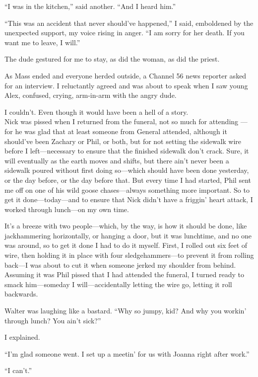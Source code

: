 ``I was in the kitchen,'' said another. ``And I heard him.''

``This was an accident that never should've happened,'' I said,
emboldened by the unexpected support, my voice rising in anger. ``I am
sorry for her death. If you want me to leave, I will.''

The dude gestured for me to stay, as did the woman, as did the priest.

As Mass ended and everyone herded outside, a Channel 56 news reporter
asked for an interview. I reluctantly agreed and was about to speak when
I saw young Alex, confused, crying, arm-in-arm with the angry dude.

I couldn't. Even though it would have been a hell of a story.\\

Nick was pissed when I returned from the funeral, not so much for
attending ---for he was glad that at least someone from General
attended, although it should've been Zachary or Phil, or both, but for
not setting the sidewalk wire before I left---necessary to ensure that
the finished sidewalk don't crack. Sure, it will eventually as the earth
moves and shifts, but there ain't never been a sidewalk poured without
first doing so---which should have been done yesterday, or the day
before, or the day before that. But every time I had started, Phil sent
me off on one of his wild goose chases---always something more
important. So to get it done---today---and to ensure that Nick didn't
have a friggin' heart attack, I worked through lunch---on my own time.

It's a breeze with two people---which, by the way, is how it should be
done, like jackhammering horizontally, or hanging a door, but it was
lunchtime, and no one was around, so to get it done I had to do it
myself. First, I rolled out six feet of wire, then holding it in place
with four sledgehammers---to prevent it from rolling back---I was about
to cut it when someone jerked my shoulder from behind. Assuming it was
Phil pissed that I had attended the funeral, I turned ready to smack
him---someday I will---accidentally letting the wire go, letting it roll
backwards.

Walter was laughing like a bastard. ``Why so jumpy, kid? And why you
workin' through lunch? You ain't sick?''

I explained.

``I'm glad someone went. I set up a meetin' for us with Joanna right
after work.''

``I can't.''

